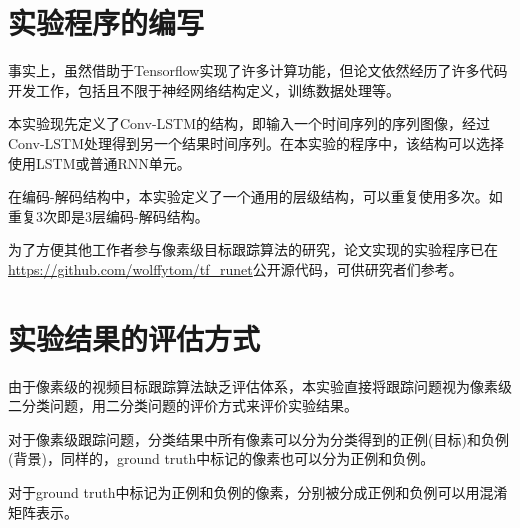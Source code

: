 \section{实验程序的编写} \label{section:software}
事实上，虽然借助于Tensorflow实现了许多计算功能，但论文依然经历了许多代码开发工作，包括且不限于神经网络结构定义，训练数据处理等。
\par
本实验现先定义了Conv-LSTM的结构，即输入一个时间序列的序列图像，经过Conv-LSTM处理得到另一个结果时间序列。在本实验的程序中，该结构可以选择使用LSTM或普通RNN单元。
\par
在编码-解码结构中，本实验定义了一个通用的层级结构，可以重复使用多次。如重复3次即是3层编码-解码结构。
\par
为了方便其他工作者参与像素级目标跟踪算法的研究，论文实现的实验程序已在\url{https://github.com/wolffytom/tf_runet}公开源代码，可供研究者们参考。

\section{实验结果的评估方式}
由于像素级的视频目标跟踪算法缺乏评估体系，本实验直接将跟踪问题视为像素级二分类问题，用二分类问题的评价方式来评价实验结果。
\par
对于像素级跟踪问题，分类结果中所有像素可以分为分类得到的正例(目标)和负例(背景)，同样的，ground truth中标记的像素也可以分为正例和负例。
\par
对于ground truth中标记为正例和负例的像素，分别被分成正例和负例可以用混淆矩阵表示。

